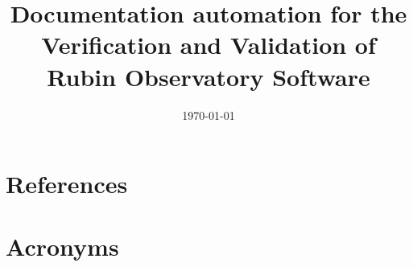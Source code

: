 \documentclass[]{spie}
\date{\today}
\title{Documentation automation for the Verification and Validation of Rubin Observatory Software}
\begin{document}
\maketitle





\appendix

\section{References} \label{sec:bib}
%



\section{Acronyms} \label{sec:acronyms}

\end{document}
